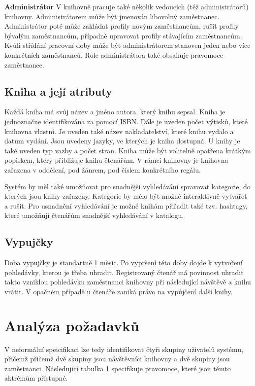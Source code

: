 \documentclass[11pt, a4paper, titlepage]{article}
\begin{document}
	\textbf{Administrátor} V knihovně pracuje také několik vedoucích (též administrátorů) knihovny.
	Administrátorem může být jmenován libovolný zaměstnanec. Administrátor poté může
	zakládat profily novým zaměstnancům, rušit profily bývalým zaměstnancům, případně upravovat
	profily stávajícím zaměstnancům. Kvůli střídání pracovní doby může být administrátorem stanoven
	jeden nebo více konkrétních zaměstnanců. Role administrátora také obsahuje pravomoce zaměstnance.

	\subsection*{Kniha a její atributy}

	Každá kniha má svůj název a jméno autora, který knihu sepsal. Kniha je jednoznačne
	identifikována za pomocí ISBN. Dále je uveden počet výtisků, které knihovna vlastní. Je uveden
	také název nakladatelství, které knihu vydalo a datum vydání. Jsou uvedeny jazyky, ve kterých
	je kniha dostupná. U knihy je také uveden typ
	vazby a počet stran. Kniha může být volitelně opatřena krátkým popiskem, který přibližuje knihu
	čtenářům. V rámci knihovny je knihovna zařazena v oddělení, pod žánrem, pod číslem konkrétního
	regálu.

	Systém by měl také umožňovat pro snadnější vyhledávání spravovat kategorie, do kterých 
	jsou knihy zařazeny. Kategorie by mělo být možné interaktivně vytvářet a rušit. Pro usnadnění
	vyhledávání je možné knihám přiřadit také tzv. hashtagy, které umožňují čtenářům
	snadnější vyhledávání v katalogu.

	\subsection*{Vypujčky}
	Doba vypujčky je standartně 1 měsíc. Po vypršení této doby dojde k vytvoření pohledávky, kterou
	je třeba uhradit. Registrovaný čtenář má povinnost uhradit takto vzniklou pohledávku zaměstnanci
	knihovny při následující návštěvě a knihu vrátit. V opačném případě u čtenáře zaniká právo na
	vypůjčení další knihy.
	

	\section*{Analýza požadavků}

	V neformální speicifikaci lze tedy identifikovat čtyři skupiny uživatelů systému, přičemž
	přičemž dvě skupiny jsou návštěvníci knihovny a dvě skupiny jsou zaměstnanci. Následující
	tabulka 1 specifikuje pravomoce, které jsou těmto aktrémům přístupné.
\end{document}
